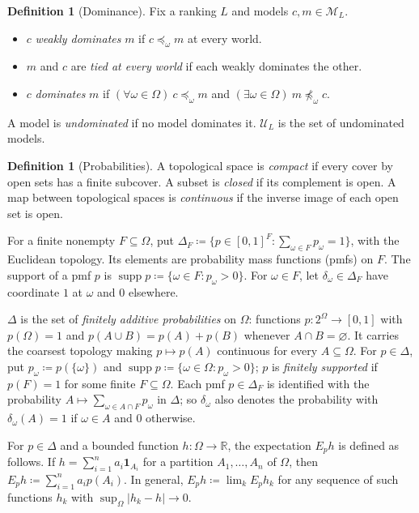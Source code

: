 \documentclass[11pt]{article}
\theoremstyle{definition}
\newtheorem{definition}[theorem]{Definition}
\theoremstyle{remark}
\newcommand{\M}{\mathcal M}
\newcommand{\U}{\mathcal U}
\newcommand{\supp}{\operatorname{supp}}
\begin{document}
\begin{definition}[Dominance]\label{def:dominance}
Fix a ranking $L$ and models $c,m\in\M_L$.
\begin{itemize}[leftmargin=*]
\item $c$ \emph{weakly dominates} $m$ if $c\preceq_\omega m$ at every world.
\item $m$ and $c$ are \emph{tied at every world} if each weakly dominates the other.
\item $c$ \emph{dominates} $m$ if $(\forall\omega\in\Omega)\ c\preceq_\omega m$ and $(\exists\omega\in\Omega)\ m\not\preceq_\omega c$.
\end{itemize}
A model is \emph{undominated} if no model dominates it. $\U_L$ is the set of undominated models.
\end{definition}

\begin{definition}[Probabilities]\label{def:priors}
{\color{red}A topological space is \emph{compact} if every cover by open sets has a finite subcover. A subset is \emph{closed} if its complement is open. A map between topological spaces is \emph{continuous} if the inverse image of each open set is open.}

For a finite nonempty $F\subseteq\Omega$, put $\Delta_F\coloneqq\{p\in[0,1]^F:\sum_{\omega\in F}p_\omega=1\}$, with the Euclidean topology. Its elements are probability mass functions (pmfs) on $F$. The support of a pmf $p$ is $\supp p\coloneqq\{\omega\in F:p_\omega>0\}$. For $\omega\in F$, let $\delta_\omega\in\Delta_F$ have coordinate $1$ at $\omega$ and $0$ elsewhere.

{\color{red}$\Delta$ is the set of \emph{finitely additive probabilities} on $\Omega$: functions $p:2^\Omega\to[0,1]$ with $p(\Omega)=1$ and $p(A\cup B)=p(A)+p(B)$ whenever $A\cap B=\varnothing$. It carries the coarsest topology making $p\mapsto p(A)$ continuous for every $A\subseteq\Omega$. For $p\in\Delta$, put $p_\omega\coloneqq p(\{\omega\})$ and $\supp p\coloneqq\{\omega\in\Omega:p_\omega>0\}$; $p$ is \emph{finitely supported} if $p(F)=1$ for some finite $F\subseteq\Omega$. Each pmf $p\in\Delta_F$ is identified with the probability $A\mapsto\sum_{\omega\in A\cap F}p_\omega$ in $\Delta$; so $\delta_\omega$ also denotes the probability with $\delta_\omega(A)=1$ if $\omega\in A$ and $0$ otherwise.

For $p\in\Delta$ and a bounded function $h:\Omega\to\mathbb R$, the expectation $E_ph$ is defined as follows. If $h=\sum_{i=1}^na_i\mathbf 1_{A_i}$ for a partition $A_1,\dots,A_n$ of $\Omega$, then $E_ph\coloneqq\sum_{i=1}^na_ip(A_i)$. In general, $E_ph\coloneqq\lim_kE_ph_k$ for any sequence of such functions $h_k$ with $\sup_\Omega|h_k-h|\to0$.}
\end{definition}
\end{document}
